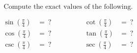 $$
\text{Compute the exact values of the following.}
$$

$$
\begin{align*}
  \sin\left(\frac{\pi}{4}\right) &=\ ? \qquad&\qquad \cot\left(\frac{\pi}{4}\right) &=\ ? \\[2ex]
  \cos\left(\frac{\pi}{4}\right) &=\ ? \qquad&\qquad \tan\left(\frac{\pi}{4}\right) &=\ ? \\[2ex]
  \csc\left(\frac{\pi}{4}\right) &=\ ? \qquad&\qquad \sec\left(\frac{\pi}{4}\right) &=\ ?
\end{align*}
$$
